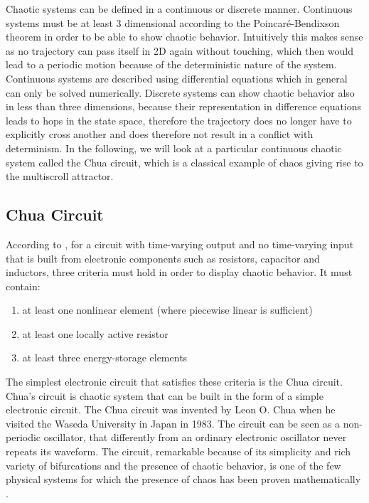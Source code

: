 \documentclass[main]{subfiles}
\begin{document}
Chaotic systems can be defined in a continuous or discrete manner. Continuous systems must be at least 3 dimensional according to the Poincaré-Bendixson theorem \cite{bib:Bendixon1901} in order to be able to show chaotic behavior. Intuitively this makes sense as no trajectory can pass itself in 2D again without touching, which then would lead to a periodic motion because of the deterministic nature of the system. Continuous systems are described using differential equations which in general can only be solved numerically. Discrete systems can show chaotic behavior also in less than three dimensions, because their representation in difference equations leads to hops in the state space, therefore the trajectory does no longer have to explicitly cross another and does therefore not result in a conflict with determinism. In the following, we will look at a particular continuous chaotic system called the Chua circuit, which is a classical example of chaos giving rise to the multiscroll attractor.

\subsection{Chua Circuit}
\label{subsec:chua-circuit}

According to \cite{bib:Kennedy1993}, for a circuit with time-varying output and no time-varying input that is built from electronic components such as resistors, capacitor and inductors, three criteria must hold in order to display chaotic behavior. It must contain:
\begin{enumerate}
  \item at least one nonlinear element (where piecewise linear is sufficient)
  \item at least one locally active resistor
  \item at least three energy-storage elements
\end{enumerate}
  
The simplest electronic circuit that satisfies these criteria is the Chua circuit. Chua's circuit is chaotic system that can be built in the form of a simple electronic circuit. The Chua circuit was invented by Leon O. Chua when he visited the Waseda University in Japan in 1983. The circuit can be seen as a non-periodic oscillator, that differently from an ordinary electronic oscillator never repeats its waveform. The circuit, remarkable because of its simplicity and rich variety of bifurcations and the presence of chaotic behavior, is one of the few physical systems for which the presence of chaos has been proven mathematically \cite{bib:Kennedy1993}.
\end{document}
